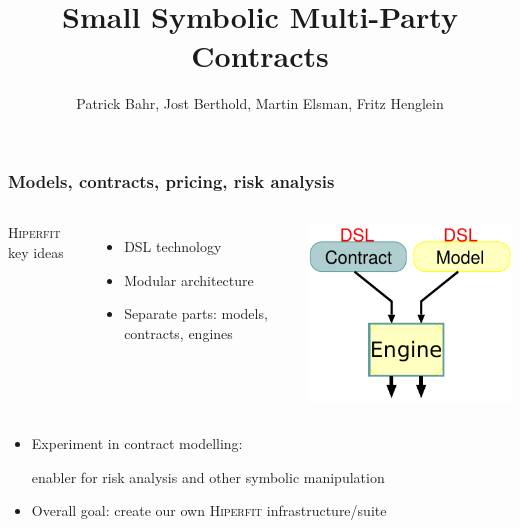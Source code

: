 \documentclass[xcolor=dvipsnames,11pt]{beamer}
\title{Small Symbolic Multi-Party Contracts}
\author[Bahr,Berthold,Elsman,Henglein]{Patrick Bahr, Jost Berthold, Martin Elsman, Fritz Henglein}
\renewcommand{\emph}[1]{\textcolor{structure!90}{#1}}
\begin{document}
\frame[plain]{\titlepage}


\begin{frame}
    \frametitle{Models, contracts, pricing, risk analysis}

\begin{columns}
\emph{\textsc{Hiperfit} key ideas}

\begin{itemize}
\item DSL technology
\item Modular architecture
\item Separate parts: models, contracts, engines
\end{itemize}
\includegraphics[width=1.1\textwidth]{DSLvision}
\end{columns}

\begin{itemize}
\item Experiment in \emph{contract modelling}:

\emph{enabler} for \emph{risk analysis} and other \emph{symbolic manipulation}
\item Overall goal: \emph{create our own \textsc{Hiperfit} infrastructure/suite}
\end{itemize}

\end{frame}
\end{document}
